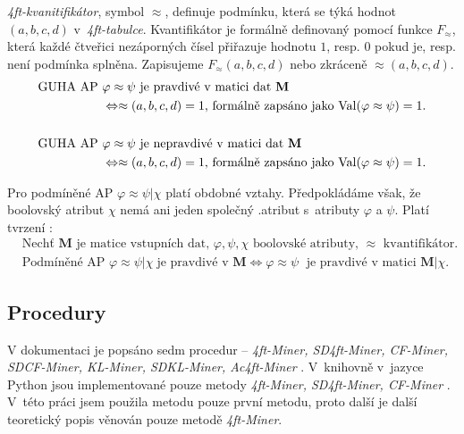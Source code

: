 \emph{4ft-kvanitifikátor}, symbol $\approx$, definuje podmínku, která se týká hodnot $(a,b,c,d)$ v~\emph{4ft-tabulce}. Kvantifikátor je formálně definovaný pomocí funkce $F_\approx$, která každé čtveřici nezáporných čísel přiřazuje hodnotu $1$, resp. $0$ pokud je, resp. není podmínka splněna. Zapisujeme $F_\approx(a,b,c,d)$ nebo zkráceně $\approx(a,b,c,d)$.\cite{bib:GUHA}
\begin{equation}
\begin{aligned}
    \mbox{GUHA AP } & \varphi \approx \psi \mbox{ je pravdivé v~matici dat }\mathbf{M} \\
    & \Leftrightarrow \approx(a,b,c,d) = 1 \mbox{, formálně zapsáno jako } \mathrm{Val}(\varphi \approx \psi) = 1.   \\
    \vspace*{.5em} \\
    \mbox{GUHA AP } & \varphi \approx \psi \mbox{ je nepravdivé v~matici dat }\mathbf{M} \\
   & \Leftrightarrow \approx(a,b,c,d) = 1 \mbox{, formálně zapsáno jako } \mathrm{Val}(\varphi \approx \psi) = 1. 
\end{aligned}
\end{equation}

Pro podmíněné AP $\varphi \approx \psi | \chi$ platí obdobné vztahy. Předpokládáme však, že boolovský atribut $\chi$ nemá ani jeden společný .atribut s~atributy $\varphi$ a $\psi$. Platí tvrzení \cite{bib:GUHA}:
\begin{equation}
    \begin{aligned}
        &\mbox{Nechť } \mathbf{M} \mbox{ je matice vstupních dat, } \varphi,\psi,\chi  \mbox{ boolovské atributy, } \approx \mbox{ kvantifikátor.} \\
        & \mbox{Podmíněné AP } \varphi \approx \psi | \chi \; \mbox{je pravdivé v~} \mathbf{M} \Leftrightarrow \varphi \approx \psi \; \mbox{ je pravdivé v~matici } \mathbf{M|}\chi.
    \end{aligned}
\end{equation}

\subsection{Procedury}

V dokumentaci \cite{bib:GUHA} je popsáno sedm procedur -- \emph{4ft-Miner,  SD4ft-Miner, CF-Miner, SDCF-Miner,  KL-Miner,  SDKL-Miner,  Ac4ft-Miner} \cite{bib:GUHA}. V~knihovně v~jazyce Python jsou implementované pouze metody \emph{4ft-Miner, SD4ft-Miner, CF-Miner} \cite{bib:GUHAclever}. V~této práci jsem použila metodu pouze první metodu, proto další je další teoretický popis věnován pouze metodě \emph{4ft-Miner}.

